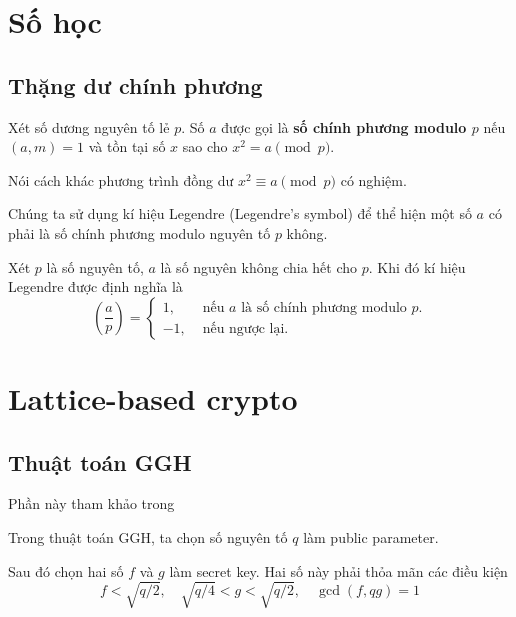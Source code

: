 \documentclass{mynotes}
\begin{document}
\chapter{Số học}

\section{Thặng dư chính phương}

\begin{definition}
    Xét số dương nguyên tố lẻ $p$. Số $a$ được gọi là \textbf{số chính phương modulo $p$} nếu $(a, m) = 1$ và tồn tại số $x$ sao cho $x^2 = a \pmod p$.

    Nói cách khác phương trình đồng dư $x^2 \equiv a \pmod p$ có nghiệm.
\end{definition}

Chúng ta sử dụng kí hiệu Legendre (Legendre's symbol) để thể hiện một số $a$ có phải là số chính phương modulo nguyên tố $p$ không.

\begin{definition}
    Xét $p$ là số nguyên tố, $a$ là số nguyên không chia hết cho $p$. Khi đó kí hiệu Legendre được định nghĩa là
    \begin{equation}
        \left(\frac{a}{p}\right) = \begin{cases}
            1, & \text{ nếu } a \text{ là số chính phương modulo } p. \\
            -1, & \text{ nếu ngược lại.}
        \end{cases}
    \end{equation}
\end{definition}

\chapter{Lattice-based crypto}

\section{Thuật toán GGH}

Phần này tham khảo trong \cite{HofJef-2014}

Trong thuật toán GGH, ta chọn số nguyên tố $q$ làm public parameter.

Sau đó chọn hai số $f$ và $g$ làm secret key. Hai số này phải thỏa mãn các điều kiện \[ f < \sqrt{q/2}, \quad \sqrt{q/4} < g < \sqrt{q/2}, \quad \gcd(f, qg) = 1 \]
\end{document}
